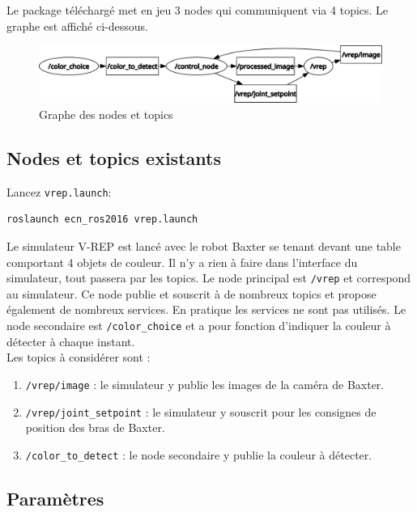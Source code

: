 \documentclass{ecnreport}
\begin{document}
Le package téléchargé met en jeu 3 nodes qui communiquent via 4 topics. Le graphe est affiché ci-dessous.

\begin{figure}[h!]
 \includegraphics[width=\linewidth]{rosgraph}
 \caption{Graphe des nodes et topics}
\end{figure}


\subsection{Nodes et topics existants}

Lancez \texttt{vrep.launch}:
\begin{center}
\begin{lstlisting}
roslaunch ecn_ros2016 vrep.launch
\end{lstlisting}
\end{center}

Le simulateur V-REP est lancé avec le robot Baxter se tenant devant une table comportant 4 objets de couleur. Il n'y a rien à faire dans l'interface du simulateur, 
tout passera par les topics. 
Le node principal est \texttt{/vrep} et correspond au simulateur. Ce node publie et souscrit à de nombreux topics et propose également de nombreux services. 
En pratique les services ne sont pas utilisés. 
Le node secondaire est \texttt{/color\_choice} et a pour fonction d'indiquer la couleur à détecter à chaque instant.\\
Les topics à considérer sont :
\begin{enumerate}
 \item \texttt{/vrep/image} : le simulateur y publie les images de la caméra de Baxter.
 \item \texttt{/vrep/joint\_setpoint} : le simulateur y souscrit pour les consignes de position des bras de Baxter.
\item \texttt{/color\_to\_detect} : le node secondaire y publie la couleur à détecter.
 \end{enumerate}

\subsection{Paramètres}
\end{document}
